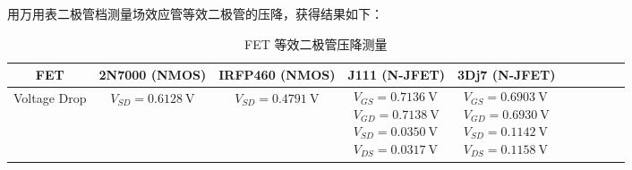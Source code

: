 \documentclass[UTF8]{article}
\begin{document}

用万用表二极管档测量场效应管等效二极管的压降，获得结果如下：
\begin{table}[H]\centering
    \caption{FET 等效二极管压降测量}
    \label{FET 等效二极管压降测量}
\begin{tabular}{cccccccccc}\toprule
    FET & 2N7000 (NMOS) &  IRFP460 (NMOS) & J111 (N-JFET) & 3Dj7 (N-JFET)\\
    \midrule
    Voltage Drop 
    & $V_{SD} = 0.6128 \ \mathrm{V}$ 
    & $V_{SD} = 0.4791 \ \mathrm{V}$ 
    & $\begin{matrix}
        V_{GS} = 0.7136 \ \mathrm{V}\\ 
        V_{GD} = 0.7138 \ \mathrm{V}\\ 
        V_{SD} = 0.0350 \ \mathrm{V}\\ 
        V_{DS} = 0.0317 \ \mathrm{V}
    \end{matrix}$
    & $\begin{matrix}
        V_{GS} = 0.6903 \ \mathrm{V}\\ 
        V_{GD} = 0.6930 \ \mathrm{V}\\ 
        V_{SD} = 0.1142 \ \mathrm{V}\\ 
        V_{DS} = 0.1158 \ \mathrm{V}
    \end{matrix}$ \\
    \bottomrule
\end{tabular}
\end{table}
\end{document}
